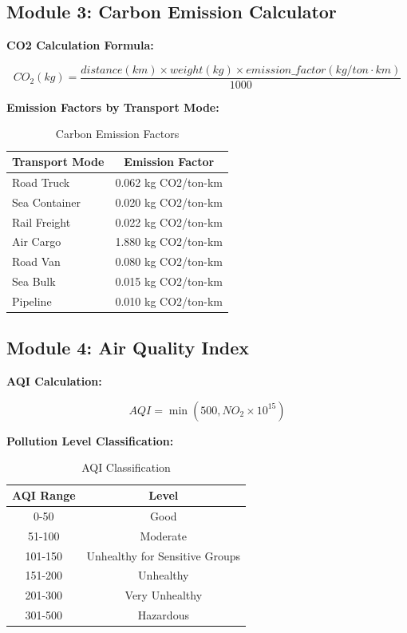 \documentclass[11pt,a4paper]{article}
\begin{document}
\subsection{Module 3: Carbon Emission Calculator}

\textbf{CO2 Calculation Formula:}

\begin{equation}
CO_2(kg) = \frac{distance(km) \times weight(kg) \times emission\_factor(kg/ton\cdot km)}{1000}
\end{equation}

\textbf{Emission Factors by Transport Mode:}

\begin{table}[H]
\centering
\begin{tabular}{|l|c|}
\hline
\textbf{Transport Mode} & \textbf{Emission Factor} \\
\hline
Road Truck & 0.062 kg CO2/ton-km \\
Sea Container & 0.020 kg CO2/ton-km \\
Rail Freight & 0.022 kg CO2/ton-km \\
Air Cargo & 1.880 kg CO2/ton-km \\
Road Van & 0.080 kg CO2/ton-km \\
Sea Bulk & 0.015 kg CO2/ton-km \\
Pipeline & 0.010 kg CO2/ton-km \\
\hline
\end{tabular}
\caption{Carbon Emission Factors}
\end{table}

\subsection{Module 4: Air Quality Index}

\textbf{AQI Calculation:}

\begin{equation}
AQI = \min(500, NO_2 \times 10^{15})
\end{equation}

\textbf{Pollution Level Classification:}

\begin{table}[H]
\centering
\begin{tabular}{|c|c|}
\hline
\textbf{AQI Range} & \textbf{Level} \\
\hline
0-50 & Good \\
51-100 & Moderate \\
101-150 & Unhealthy for Sensitive Groups \\
151-200 & Unhealthy \\
201-300 & Very Unhealthy \\
301-500 & Hazardous \\
\hline
\end{tabular}
\caption{AQI Classification}
\end{table}
\end{document}
